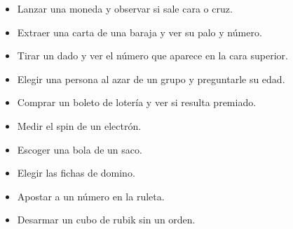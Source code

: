\begin{itemize}
    \item Lanzar una moneda y observar si sale cara o cruz. 

    \item Extraer una carta de una baraja y ver su palo y número. 

    \item Tirar un dado y ver el número que aparece en la cara superior. 

    \item Elegir una persona al azar de un grupo y preguntarle su edad. 

    \item Comprar un boleto de lotería y ver si resulta premiado.

    \item Medir el spin de un electrón.

    \item Escoger una bola de un saco.

    \item Elegir las fichas de domino.

    \item Apostar a un número en la ruleta.

    \item Desarmar un cubo de rubik sin un orden.
\end{itemize}